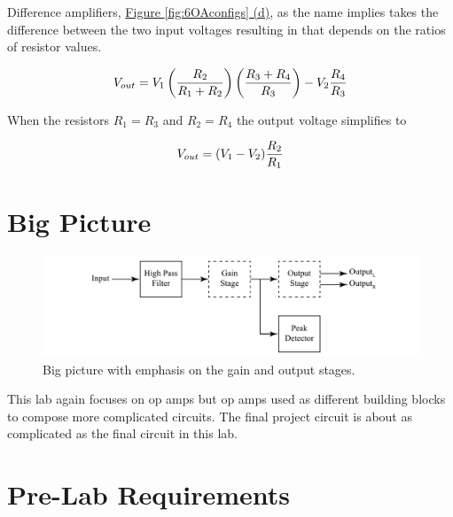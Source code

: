 Difference amplifiers, \hyperref[fig:6OAconfigs]{Figure \ref*{fig:6OAconfigs} (d)}, as the name implies takes the difference between the two input voltages resulting in that depends on the ratios of resistor values.

\begin{equation}
	\centering
	V_{out} =  V_1 \left(\frac{R_2}{R_1+R_2}\right)\left(\frac{R_3+R_4}{R_3}\right)-V_2\frac{R_4}{R_3}  
\end{equation}

\noindent When the resistors $R_1 = R_3$ and $R_2 = R_4$ the output voltage simplifies to 

\begin{equation}
	\centering
	V_{out} =  (V_1-V_2)\frac{R_2}{R_1}  
\end{equation}

\section{Big Picture}

\begin{figure} [h]
	\centering
		\includegraphics[width=1\textwidth]{Lab5bigpicture.pdf}
	\caption{Big picture with emphasis on the gain and output stages.} \label{fig:6bp}
\end{figure}

This lab again focuses on op amps but op amps used as different building blocks to compose more complicated circuits. The final project circuit is about as complicated as the final circuit in this lab. 

\section{Pre-Lab Requirements}

